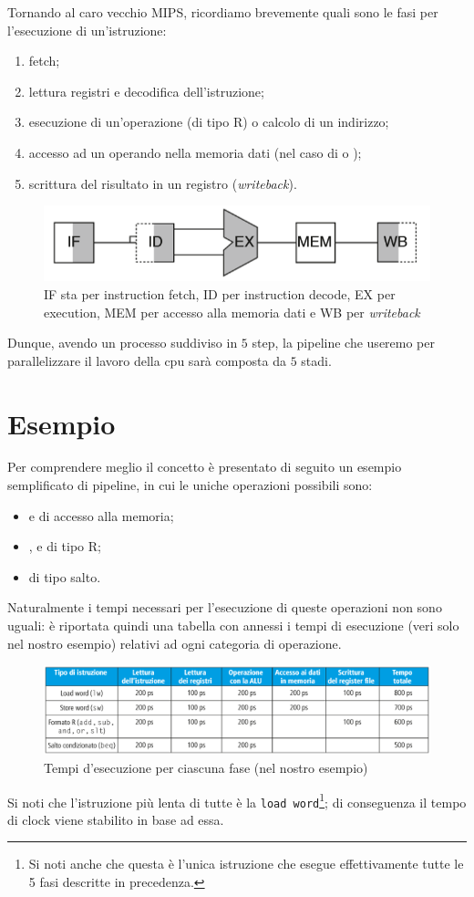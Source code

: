 \documentclass[class=book, crop=false, oneside]{standalone}
\begin{document}
Tornando al caro vecchio MIPS, ricordiamo brevemente quali sono le fasi per l'esecuzione di un'istruzione:
\begin{enumerate}[noitemsep]
	\item fetch;
	\item lettura registri e decodifica dell'istruzione;
	\item esecuzione di un'operazione (di tipo R) o calcolo di un indirizzo;
	\item accesso ad un operando nella memoria dati (nel caso di  o );
	\item scrittura del risultato in un registro (\emph{writeback}).
\end{enumerate}
\begin{figure}[H]
	\centering
	\includegraphics[width=.5\textwidth,keepaspectratio]{istruzione.png}
	\caption{IF sta per instruction fetch, ID per instruction decode, EX per execution, MEM per accesso alla memoria dati e WB per \emph{writeback}}
\end{figure}
Dunque, avendo un processo suddiviso in \(5\) step, la pipeline che useremo per parallelizzare il lavoro della \acrshort{cpu} sarà composta da \(5\) stadi.

\section{Esempio}
Per comprendere meglio il concetto è presentato di seguito un esempio semplificato di pipeline, in cui le uniche operazioni possibili sono:
\begin{itemize}
	\item {} e  di accesso alla memoria;
	\item {},  e  di tipo R;
	\item {} di tipo salto.
\end{itemize}
Naturalmente i tempi necessari per l'esecuzione di queste operazioni non sono uguali: è riportata quindi una tabella con annessi i tempi di esecuzione (veri solo nel nostro esempio) relativi ad ogni categoria di operazione.
\begin{figure}[H]
	\centering
	\includegraphics[width=\textwidth,keepaspectratio]{tabella-tempi-operazioni.png}
	\caption{Tempi d'esecuzione per ciascuna fase (nel nostro esempio)}
\end{figure}
Si noti che l'istruzione più lenta di tutte è la \texttt{load word}\footnote{Si noti anche che questa è l'unica istruzione che esegue effettivamente tutte le 5 fasi descritte in precedenza.}; di conseguenza il tempo di clock viene stabilito in base ad essa.
\end{document}
